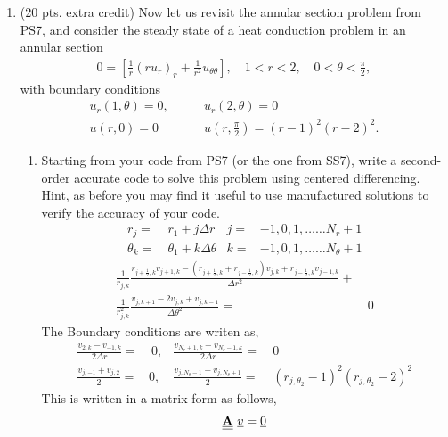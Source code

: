 \documentclass[11pt]{article}
\newcommand{\bra}[1]{\left(#1\right)}
\begin{document}
\begin{enumerate}
  \item {\color{red}(20 pts. extra credit) Now let us revisit the annular section problem from PS7, and consider the steady state of a heat conduction problem in an annular section}
  \begin{align*}
    0 = \left[\frac{1}{r}(ru_r)_r+\frac{1}{r^2}u_{\theta\theta}\right], \quad 1<r<2, \quad 0<\theta<\frac{\pi}{2},
  \end{align*}
  {\color{red}with boundary conditions}
  \begin{align*}
    u_r(1,\theta) = 0, \qquad & u_r(2,\theta) = 0 \\
    u(r,0) = 0 \qquad & u(r,\frac{\pi}{2}) = (r-1)^2(r-2)^2.
  \end{align*}
  
  \begin{enumerate}
    \item {\color{blue}Starting from your code from PS7 (or the one from SS7), write a second-order accurate code to solve this problem using centered differencing. Hint, as before you may find it useful to use manufactured solutions to verify the accuracy of your code.}
    \begin{align*}
        r_j =& \ r_1 + j\Delta r & j=& -1,0,1,\ldots \ldots N_r+1\\
        \theta_k =& \ \theta_1 + k\Delta \theta & k=& -1,0,1,\ldots \ldots N_\theta +1
    \end{align*}
    \begin{align*}
        \frac{1}{r_{j,k}}\frac{r_{j+\frac{1}{2},k}v_{j+1,k}-\bra{r_{j+\frac{1}{2},k}+r_{j-\frac{1}{2},k}}v_{j,k}+r_{j-\frac{1}{2},k}v_{j-1,k} }{\Delta r^2}+& \\
        \frac{1}{r_{j,k}^2}\frac{v_{j,k+1}-2v_{j,k}+v_{j,k-1}}{\Delta \theta^2} =& \ 0
    \end{align*}
    The Boundary conditions are writen as,
    \begin{align*}
        \frac{v_{2,k}-v_{-1,k}}{2\Delta r} =& \ 0, & \frac{v_{N_r+1,k}-v_{N_r-1,k}}{2\Delta r} =& \ 0 \\
        \frac{v_{j,-1}+v_{j,2}}{2} =& 0, & \frac{v_{j,N_\theta-1}+v_{j,N_\theta+1}}{2} =& \ (r_{j,\theta_2}-1)^2(r_{j,\theta_2}-2)^2
    \end{align*}
    This is written in a matrix form as follows,
    \begin{align*}
        {\bf \underline{\underline{A}}} \ \underline{v} = \underline{0}
    \end{align*}

\end{enumerate}
\end{enumerate}
\end{document}
